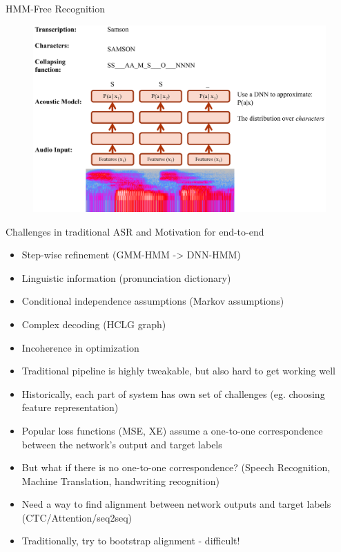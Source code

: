 \documentclass[10pt]{beamer}
\begin{document}
\begin{frame}[fragile]{HMM-Free Recognition}
\begin{figure}
\includegraphics[height=0.8\textheight]{./images/page-12.png}
\end{figure}
\end{frame}

\begin{frame}[fragile]{Challenges in traditional ASR and Motivation for end-to-end}
\begin{itemize}
	\item Step-wise refinement (GMM-HMM -> DNN-HMM)
	\item Linguistic information (pronunciation dictionary)
	\item Conditional independence assumptions (Markov assumptions)
	\item Complex decoding (HCLG graph)
	\item Incoherence in optimization
	\item Traditional pipeline is highly tweakable, but also hard to get working well
	\item Historically, each part of system has own set of challenges (eg. choosing feature representation)
	\item Popular loss functions (MSE, XE) assume a one-to-one correspondence between the network’s output and target labels
	\item But what if there is no one-to-one correspondence? (Speech Recognition, Machine Translation, handwriting recognition)
	\item Need a way to find alignment between network outputs and target labels (CTC/Attention/seq2seq)
	\item Traditionally, try to bootstrap alignment - difficult!
\end{itemize}
\end{frame}
\end{document}
